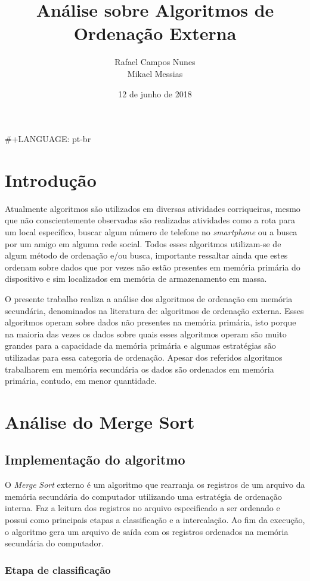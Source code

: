 \documentclass[a4paper, 12pt]{report}
\author{Rafael Campos Nunes  \\ Mikael Messias}
\date{12 de junho de 2018}
\title{Análise sobre Algoritmos de Ordenação Externa}
\begin{document}
\maketitle
\#+LANGUAGE: pt-br

\part{Introdução}
\label{sec-1}

Atualmente algoritmos são utilizados em diversas atividades corriqueiras,
mesmo que não conscientemente observadas são realizadas atividades como a
rota para um local específico, buscar algum número de telefone no \emph{smartphone}
ou a busca por um amigo em alguma rede social. Todos esses algoritmos
utilizam-se de algum método de ordenação e/ou busca, importante ressaltar ainda
que estes ordenam sobre dados que por vezes não estão presentes em memória
primária do dispositivo e sim localizados em memória de armazenamento em massa.

O presente trabalho realiza a análise dos algoritmos de ordenação em memória
secundária, denominados na literatura de: algoritmos de ordenação externa.
Esses algoritmos operam sobre dados não presentes na memória primária, isto
porque na maioria das vezes os dados sobre quais esses algoritmos operam são
muito grandes para a capacidade da memória primária e algumas estratégias são
utilizadas para essa categoria de ordenação. Apesar dos referidos algoritmos
trabalharem em memória secundária os dados são ordenados em memória primária,
contudo, em menor quantidade.

\part{Análise do Merge Sort}
\label{sec-2}
\chapter{Implementação do algoritmo}
\label{sec-2-1}

O \emph{Merge} \emph{Sort} externo é um algoritmo que rearranja os registros de um
arquivo da memória secundária do computador utilizando uma estratégia de
ordenação interna. Faz a leitura dos registros no arquivo especificado a ser
ordenado e possui como principais etapas a classificação e a intercalação.
Ao fim da execução, o algoritmo gera um arquivo de saída com os registros
ordenados na memória secundária do computador.

\section{Etapa de classificação}
\label{sec-2-1-1}
\end{document}
